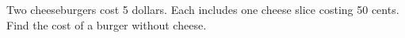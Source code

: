 Two cheeseburgers cost 5 dollars. Each includes one cheese slice costing 50 cents. Find the cost of a burger without cheese.
